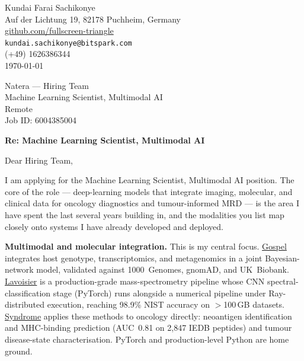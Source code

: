\documentclass[12pt,a4paper]{article}
\begin{document}
\begin{flushright}
Kundai Farai Sachikonye \\
Auf der Lichtung 19, 82178 Puchheim, Germany \\
\href{https://github.com/fullscreen-triangle}{github.com/fullscreen-triangle} \\
\texttt{kundai.sachikonye@bitspark.com} \\
(+49) 1626386344 \\[6pt]
\today
\end{flushright}

\vspace{1em}

Natera --- Hiring Team \\
Machine Learning Scientist, Multimodal AI \\
Remote \\
Job ID: 6004385004

\vspace{1.5em}

\textbf{Re: Machine Learning Scientist, Multimodal AI}

\vspace{1em}

Dear Hiring Team,

I am applying for the Machine Learning Scientist, Multimodal AI position. The
core of the role --- deep-learning models that integrate imaging, molecular, and
clinical data for oncology diagnostics and tumour-informed MRD --- is the area I
have spent the last several years building in, and the modalities you list map
closely onto systems I have already developed and deployed.

\textbf{Multimodal and molecular integration.}
This is my central focus. \href{https://github.com/fullscreen-triangle/gospel}{Gospel}
integrates host genotype, transcriptomics, and metagenomics in a joint
Bayesian-network model, validated against 1000~Genomes, gnomAD, and UK~Biobank.
\href{https://github.com/fullscreen-triangle/lavoisier}{Lavoisier} is a
production-grade mass-spectrometry pipeline whose CNN spectral-classification
stage (PyTorch) runs alongside a numerical pipeline under Ray-distributed
execution, reaching 98.9\% NIST accuracy on $>$100\,GB datasets.
\href{https://syndrome-seven.vercel.app/tools}{Syndrome} applies these methods to
oncology directly: neoantigen identification and MHC-binding prediction
(AUC~0.81 on 2{,}847 IEDB peptides) and tumour disease-state characterisation.
PyTorch and production-level Python are home ground.
\end{document}
